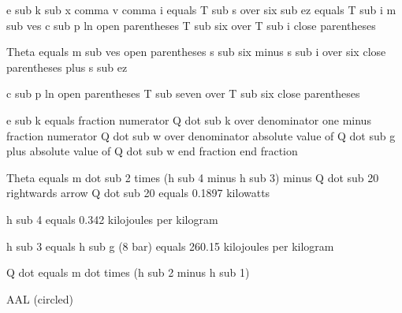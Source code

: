 e sub k sub x comma v comma i equals T sub s over six sub ez equals T sub i m sub ves c sub p ln open parentheses T sub six over T sub i close parentheses

Theta equals m sub ves open parentheses s sub six minus s sub i over six close parentheses plus s sub ez

c sub p ln open parentheses T sub seven over T sub six close parentheses

e sub k equals fraction numerator Q dot sub k over denominator one minus fraction numerator Q dot sub w over denominator absolute value of Q dot sub g plus absolute value of Q dot sub w end fraction end fraction  

Theta equals m dot sub 2 times (h sub 4 minus h sub 3) minus Q dot sub 20 rightwards arrow Q dot sub 20 equals 0.1897 kilowatts  

h sub 4 equals 0.342 kilojoules per kilogram  

h sub 3 equals h sub g (8 bar) equals 260.15 kilojoules per kilogram  

Q dot equals m dot times (h sub 2 minus h sub 1)  

AAL (circled)
